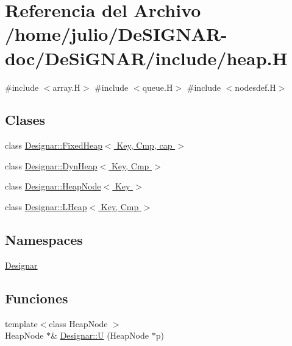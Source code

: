 \hypertarget{heap_8_h}{}\section{Referencia del Archivo /home/julio/\+De\+S\+I\+G\+N\+A\+R-\/doc/\+De\+Si\+G\+N\+A\+R/include/heap.H}
\label{heap_8_h}
{\ttfamily \#include $<$array.\+H$>$}\newline
{\ttfamily \#include $<$queue.\+H$>$}\newline
{\ttfamily \#include $<$nodesdef.\+H$>$}\newline
\subsection*{Clases}
\begin{DoxyCompactItemize}
\item 
class \hyperlink{class_designar_1_1_fixed_heap}{Designar\+::\+Fixed\+Heap$<$ Key, Cmp, cap $>$}
\item 
class \hyperlink{class_designar_1_1_dyn_heap}{Designar\+::\+Dyn\+Heap$<$ Key, Cmp $>$}
\item 
class \hyperlink{class_designar_1_1_heap_node}{Designar\+::\+Heap\+Node$<$ Key $>$}
\item 
class \hyperlink{class_designar_1_1_l_heap}{Designar\+::\+L\+Heap$<$ Key, Cmp $>$}
\end{DoxyCompactItemize}
\subsection*{Namespaces}
\begin{DoxyCompactItemize}
\item 
 \hyperlink{namespace_designar}{Designar}
\end{DoxyCompactItemize}
\subsection*{Funciones}
\begin{DoxyCompactItemize}
\item 
{\footnotesize template$<$class Heap\+Node $>$ }\\Heap\+Node $\ast$\& \hyperlink{namespace_designar_a67f4b8d103125d6c93110f43f4446187}{Designar\+::U} (Heap\+Node $\ast$p)
\end{DoxyCompactItemize}
